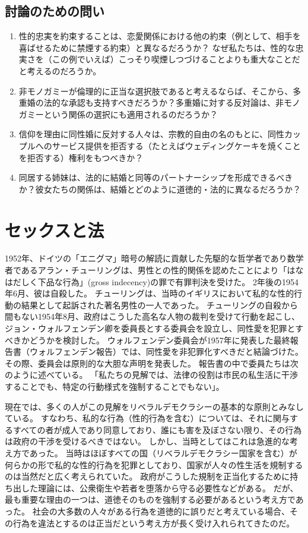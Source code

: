 \documentclass[paper=a4,book,openany]{jlreq}
\begin{document}
\section{討論のための問い}

\begin{enumerate}
\item 性的忠実を約束することは、恋愛関係における他の約束（例として、相手を喜ばせるために禁煙する約束）と異なるだろうか？ なぜ私たちは、性的な忠実さを（この例でいえば）こっそり喫煙しつづけることよりも重大なことだと考えるのだろうか。
\item 非モノガミーが倫理的に正当な選択肢であると考えるならば、そこから、多重婚の法的な承認も支持すべきだろうか？多重婚に対する反対論は、非モノガミーという関係の選択にも適用されるのだろうか？

\item 信仰を理由に同性婚に反対する人々は、宗教的自由の名のもとに、同性カップルへのサービス提供を拒否する（たとえばウェディングケーキを焼くことを拒否する）権利をもつべきか？
\item 同居する姉妹は、法的に結婚と同等のパートナーシップを形成できるべきか？彼女たちの関係は、結婚とどのように道徳的・法的に異なるだろうか？
\end{enumerate}

\chapter{セックスと法}

1952年、ドイツの「エニグマ」暗号の解読に貢献した先駆的な哲学者であり数学者であるアラン・チューリングは、男性との性的関係を認めたことにより「はなはだしく下品な行為」(gross indecency)の罪で有罪判決を受けた。
2年後の1954年6月、彼は自殺した。
チューリングは、当時のイギリスにおいて私的な性的行動の結果として起訴された著名男性の一人であった。
チューリングの自殺から間もない1954年8月、政府はこうした高名な人物の裁判を受けて行動を起こし、ジョン・ウォルフェンデン卿を委員長とする委員会を設立し、同性愛を犯罪とすべきかどうかを検討した。
ウォルフェンデン委員会が1957年に発表した最終報告書（ウォルフェンデン報告）では、同性愛を非犯罪化すべきだと結論づけた。
その際、委員会は原則的な大胆な声明を発表した。
報告書の中で委員たちは次のように述べている。
「私たちの見解では、法律の役割は市民の私生活に干渉することでも、特定の行動様式を強制することでもない」\citep{wollfenden57:_repor_commit_homos_offen_prost}。

現在では、多くの人がこの見解をリベラルデモクラシーの基本的な原則とみなしている。
すなわち、私的な行為（性的行為を含む）については、それに関与するすべての者が成人であり同意しており、誰にも害を及ぼさない限り、その行為は政府の干渉を受けるべきではない。
しかし、当時としてはこれは急進的な考え方であった。
当時はほぼすべての国（リベラルデモクラシー国家を含む）が何らかの形で私的な性的行為を犯罪としており、国家が人々の性生活を規制するのは当然だと広く考えられていた。
政府がこうした規制を正当化するために持ち出した理論には、公衆衛生や若者を堕落から守る必要性などがある。
だが、最も重要な理由の一つは、道徳そのものを強制する必要があるという考え方であった。
社会の大多数の人々がある行為を道徳的に誤りだと考えている場合、その行為を違法とするのは正当だという考え方が長く受け入れられてきたのだ。
\end{document}
